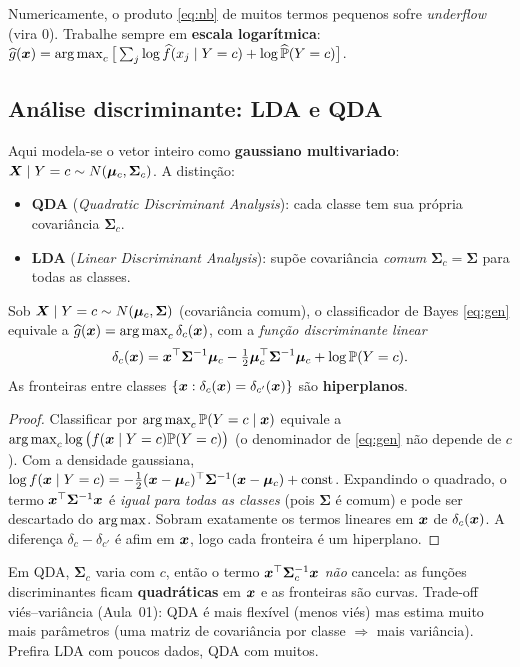 \documentclass[11pt,a4paper]{article}
\begin{document}
\begin{atencao}
Numericamente, o produto \eqref{eq:nb} de muitos termos pequenos sofre
\emph{underflow} (vira $0$). Trabalhe sempre em \textbf{escala logarítmica}:
$\ghat(\x)=\argmax_c\big[\sum_j \log \widehat f(x_j\mid Y=c)+\log\widehat\Prob(Y=c)\big]$.
\end{atencao}

\subsection{Análise discriminante: LDA e QDA}
Aqui modela-se o vetor inteiro como \textbf{gaussiano multivariado}:
$\bm{X}\mid Y=c \sim N(\bm{\mu}_c,\bm{\Sigma}_c)$. A distinção:
\begin{itemize}[leftmargin=1.4cm,nosep]
  \item \textbf{QDA} (\emph{Quadratic Discriminant Analysis}): cada classe tem sua
        própria covariância $\bm{\Sigma}_c$.
  \item \textbf{LDA} (\emph{Linear Discriminant Analysis}): supõe covariância
        \emph{comum} $\bm{\Sigma}_c=\bm{\Sigma}$ para todas as classes.
\end{itemize}

\begin{proposicao}\label{prop:lda}
Sob $\bm{X}\mid Y=c\sim N(\bm{\mu}_c,\bm{\Sigma})$ (covariância comum), o classificador
de Bayes \eqref{eq:gen} equivale a $\ghat(\x)=\argmax_c \delta_c(\x)$, com a
\emph{função discriminante linear}
\[
  \delta_c(\bm{x}) = \bm{x}^\top\bm{\Sigma}^{-1}\bm{\mu}_c
   - \tfrac12\bm{\mu}_c^\top\bm{\Sigma}^{-1}\bm{\mu}_c + \log\mathbb{P}(Y=c).
\]
As fronteiras entre classes $\{\bm{x}:\delta_c(\bm{x})=\delta_{c'}(\bm{x})\}$ são
\textbf{hiperplanos}.
\end{proposicao}
\begin{proof}
Classificar por $\argmax_c \Prob(Y=c\mid\x)$ equivale a $\argmax_c \log\big(f(\x\mid
Y=c)\Prob(Y=c)\big)$ (o denominador de \eqref{eq:gen} não depende de $c$). Com a
densidade gaussiana,
$\log f(\bm{x}\mid Y=c)=-\tfrac12(\bm{x}-\bm{\mu}_c)^\top\bm{\Sigma}^{-1}(\bm{x}-\bm{\mu}_c)
+\text{const}$. Expandindo o quadrado, o termo $\bm{x}^\top\bm{\Sigma}^{-1}\bm{x}$ é
\emph{igual para todas as classes} (pois $\bm{\Sigma}$ é comum) e pode ser
descartado do $\argmax$. Sobram exatamente os termos lineares em $\bm{x}$ de
$\delta_c(\bm{x})$. A diferença $\delta_c-\delta_{c'}$ é afim em $\bm{x}$, logo cada
fronteira é um hiperplano.
\end{proof}

\begin{observacao}
Em QDA, $\bm{\Sigma}_c$ varia com $c$, então o termo
$\bm{x}^\top\bm{\Sigma}_c^{-1}\bm{x}$ \emph{não} cancela: as funções discriminantes ficam
\textbf{quadráticas} em $\bm{x}$ e as fronteiras são curvas. Trade-off viés--variância
(Aula~01): QDA é mais flexível (menos viés) mas estima muito mais parâmetros (uma
matriz de covariância por classe $\Rightarrow$ mais variância). Prefira LDA com
poucos dados, QDA com muitos.
\end{observacao}
\end{document}
